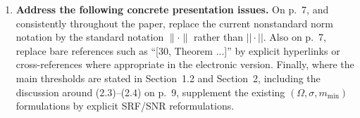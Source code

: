 \documentclass[11pt]{article}
\begin{document}
\begin{enumerate}[leftmargin=2.2em]
\item \textbf{Address the following concrete presentation issues.}
On p.~7, and consistently throughout the paper, replace the current nonstandard norm notation by the standard notation
$\|\cdot\|$ rather than $||\cdot||$.
Also on p.~7, replace bare references such as ``[30, Theorem ...]'' by explicit
hyperlinks or cross-references where appropriate in the electronic version.
Finally, where the main thresholds are stated in Section~1.2 and Section~2, including
the discussion around (2.3)--(2.4) on p.~9, supplement the existing
$(\Omega,\sigma,m_{\min})$ formulations by explicit SRF/SNR reformulations.
\end{enumerate}
\end{document}
